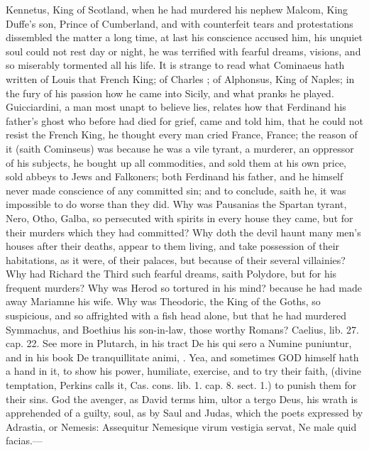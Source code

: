 {Kennetus, King of Scotland, when he had murdered his nephew
Malcom, King Duffe's son, Prince of Cumberland, and with counterfeit
tears and protestations dissembled the matter a long time, at
last his conscience accused him, his unquiet soul could not rest day or
night, he was terrified with fearful dreams, visions, and so miserably
tormented all his life. It is strange to read what Cominaeus hath
written of Louis  that French King; of Charles ; of Alphonsus,
King of Naples; in the fury of his passion how he came into Sicily, and
what pranks he played. Guicciardini, a man most unapt to believe lies,
relates how that Ferdinand his father's ghost who before had died for
grief, came and told him, that he could not resist the French King, he
thought every man cried France, France; the reason of it (saith
Cominseus) was because he was a vile tyrant, a murderer, an oppressor
of his subjects, he bought up all commodities, and sold them at his own
price, sold abbeys to Jews and Falkoners; both Ferdinand his father,
and he himself never made conscience of any committed sin; and to
conclude, saith he, it was impossible to do worse than they did. Why
was Pausanias the Spartan tyrant, Nero, Otho, Galba, so persecuted with
spirits in every house they came, but for their murders which they had
committed? Why doth the devil haunt many men's houses after their
deaths, appear to them living, and take possession of their
habitations, as it were, of their palaces, but because of their several
villainies? Why had Richard the Third such fearful dreams, saith
Polydore, but for his frequent murders? Why was Herod so tortured in
his mind? because he had made away Mariamne his wife. Why was
Theodoric, the King of the Goths, so suspicious, and so affrighted with
a fish head alone, but that he had murdered Symmachus, and Boethius his
son-in-law, those worthy Romans? Caelius, lib. 27. cap. 22. See more in
Plutarch, in his tract De his qui sero a Numine puniuntur, and in his
book De tranquillitate animi, \etc{}. Yea, and sometimes \textsc{GOD} himself hath a
hand in it, to show his power, humiliate, exercise, and to try their
faith, (divine temptation, Perkins calls it, Cas. cons. lib. 1. cap. 8.
sect. 1.) to punish them for their sins. God the avenger, as
David terms him, ultor a tergo Deus, his wrath is apprehended of
a guilty, soul, as by Saul and Judas, which the poets expressed by
Adrastia, or Nemesis:
Assequitur Nemesique virum vestigia servat,
Ne male quid facias.---

}
